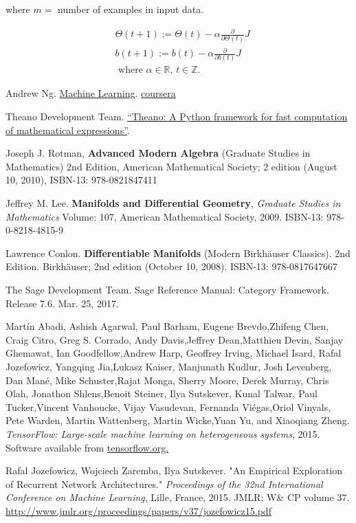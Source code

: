 \documentclass[10pt]{amsart}
\begin{document}
\begin{huge}
where $m = $ number of examples in input data.  

\[
\begin{aligned}
	& \Theta(t+1) := \Theta(t) - \alpha \frac{\partial }{ \partial \Theta(t)} J  \\
	& b(t+1) := b(t) - \alpha \frac{\partial }{ \partial b(t)} J    \\
	& \text{ where $\alpha \in \mathbb{R}$, $t\in \mathbb{Z}$.}  
\end{aligned}
\]

\end{huge}

\begin{thebibliography}{9}

Andrew Ng.  \href{https://www.coursera.org/learn/machine-learning/home/welcome}{Machine Learning}.  \href{https://www.coursera.org}{coursera}

Theano Development Team. \href{http://arxiv.org/pdf/1605.02688.pdf}{“Theano: A Python framework for fast computation of mathematical expressions”}. 

Joseph J. Rotman, \textbf{Advanced Modern Algebra} (Graduate Studies in Mathematics) 2nd Edition, American Mathematical Society; 2 edition (August 10, 2010), ISBN-13: 978-0821847411

Jeffrey M. Lee. \textbf{Manifolds and Differential Geometry}, \emph{Graduate Studies in Mathematics} Volume: 107, American Mathematical Society, 2009. ISBN-13: 978-0-8218-4815-9

Lawrence Conlon.  \textbf{Differentiable Manifolds} (Modern Birkhäuser Classics).  2nd Edition.  Birkhäuser; 2nd edition (October 10, 2008).  ISBN-13: 978-0817647667

The Sage Development Team.  Sage Reference Manual: Category Framework.  Release 7.6.  Mar. 25, 2017.  

Martín Abadi, Ashish Agarwal, Paul Barham, Eugene Brevdo,Zhifeng Chen, Craig Citro, Greg S. Corrado, Andy Davis,Jeffrey Dean,Matthieu Devin, Sanjay Ghemawat, Ian Goodfellow,Andrew Harp, Geoffrey Irving, Michael Isard, Rafal Jozefowicz, Yangqing Jia,Lukasz Kaiser, Manjunath Kudlur, Josh Levenberg, Dan Mané, Mike Schuster,Rajat Monga, Sherry Moore, Derek Murray, Chris Olah, Jonathon Shlens,Benoit Steiner, Ilya Sutskever, Kunal Talwar, Paul Tucker,Vincent Vanhoucke, Vijay Vasudevan, Fernanda Viégas,Oriol Vinyals, Pete Warden, Martin Wattenberg, Martin Wicke,Yuan Yu, and Xiaoqiang Zheng.  
\emph{TensorFlow: Large-scale machine learning on heterogeneous systems}, 2015. Software available from \href{http://tensorflow.org/}{tensorflow.org.}

Rafal Jozefowicz, Wojciech Zaremba, Ilya Sutskever.  "An Empirical Exploration of Recurrent Network Architectures."  \emph{Proceedings of the 32nd International  Conference on  Machine Learning}, Lille, France, 2015.  JMLR: W\& CP volume 37.  \url{http://www.jmlr.org/proceedings/papers/v37/jozefowicz15.pdf} 
  
\end{thebibliography}
\end{document}
